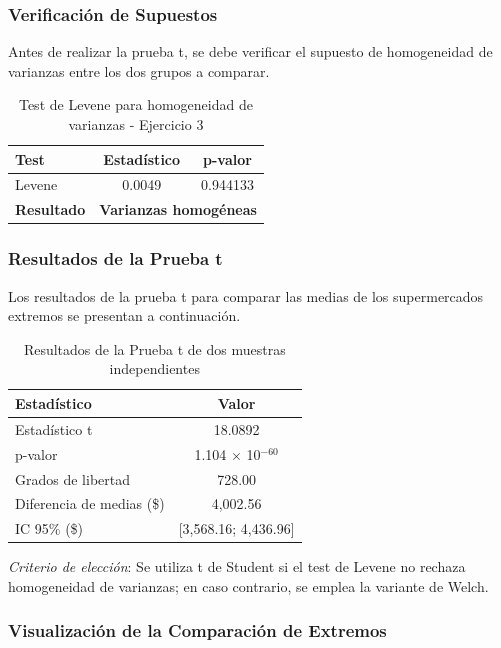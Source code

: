 \documentclass[11pt,a4paper]{article}
\begin{document}
\subsubsection{Verificación de Supuestos}

Antes de realizar la prueba t, se debe verificar el supuesto de homogeneidad de varianzas entre los dos grupos a comparar.

\begin{table}[H]
\centering
\caption{Test de Levene para homogeneidad de varianzas - Ejercicio 3}
\begin{tabular}{|l|c|c|}
\hline
\textbf{Test} & \textbf{Estadístico} & \textbf{p-valor} \\
\hline
Levene & 0.0049 & 0.944133 \\
\hline
\textbf{Resultado} & \multicolumn{2}{c|}{\textbf{Varianzas homogéneas}} \\
\hline
\end{tabular}
\end{table}

\subsubsection{Resultados de la Prueba t}

Los resultados de la prueba t para comparar las medias de los supermercados extremos se presentan a continuación.

\begin{table}[H]
\centering
\caption{Resultados de la Prueba t de dos muestras independientes}
\begin{tabular}{|l|c|}
\hline
\textbf{Estadístico} & \textbf{Valor} \\
\hline
Estadístico t & 18.0892 \\
p-valor & 1.104 $\times$ 10$^{-60}$ \\
Grados de libertad & 728.00 \\
Diferencia de medias (\$) & 4,002.56 \\
IC 95\% (\$) & [3,568.16; 4,436.96] \\
\hline
\end{tabular}
\end{table}

\noindent\textit{Criterio de elección}: Se utiliza t de Student si el test de Levene no rechaza homogeneidad de varianzas; en caso contrario, se emplea la variante de Welch.

\subsubsection{Visualización de la Comparación de Extremos}
\end{document}
